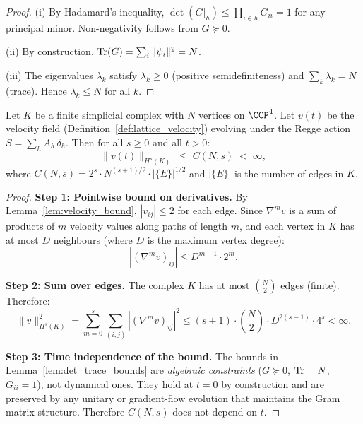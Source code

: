 \begin{proof}
(i) By Hadamard's inequality, $\det(G|_h) \leq \prod_{i \in h} G_{ii}
= 1$ for any principal minor.  Non-negativity follows from
$G \succeq 0$.

(ii) By construction, $\operatorname{Tr}(G) = \sum_i \|\psi_i\|^2 = N$.

(iii) The eigenvalues $\lambda_k$ satisfy $\lambda_k \geq 0$
(positive semidefiniteness) and $\sum_k \lambda_k = N$ (trace).
Hence $\lambda_k \leq N$ for all $k$.
\end{proof}

\begin{theorem}
\label{thm:lattice_regularity}
Let $K$ be a finite simplicial complex with $N$ vertices on $\CCP^4$.
Let $v(t)$ be the velocity field (Definition~\ref{def:lattice_velocity})
evolving under the Regge action $S = \sum_h A_h\,\delta_h$.
Then for all $s \geq 0$ and all $t > 0$:
\begin{equation}
\boxed{\|v(t)\|_{H^s(K)} \;\leq\; C(N, s) \;<\; \infty,}
\end{equation}
where $C(N,s) = 2^s \cdot N^{(s+1)/2} \cdot |\{E\}|^{1/2}$ and
$|\{E\}|$ is the number of edges in $K$.
\end{theorem}

\begin{proof}
\textbf{Step 1: Pointwise bound on derivatives.}
By Lemma~\ref{lem:velocity_bound}, $|v_{ij}| \leq 2$ for each edge.
Since $\nabla^m v$ is a sum of products of $m$ velocity values along
paths of length $m$, and each vertex in $K$ has at most $D$ neighbours
(where $D$ is the maximum vertex degree):
\begin{equation}
|(\nabla^m v)_{ij}| \leq D^{m-1} \cdot 2^m.
\end{equation}

\textbf{Step 2: Sum over edges.}
The complex $K$ has at most $\binom{N}{2}$ edges (finite).  Therefore:
\begin{equation}
\|v\|_{H^s(K)}^2 = \sum_{m=0}^{s} \sum_{(i,j)} |(\nabla^m v)_{ij}|^2
\leq (s+1) \cdot \binom{N}{2} \cdot D^{2(s-1)} \cdot 4^s < \infty.
\end{equation}

\textbf{Step 3: Time independence of the bound.}
The bounds in Lemma~\ref{lem:det_trace_bounds} are
\emph{algebraic constraints} ($G \succeq 0$, $\operatorname{Tr} = N$, $G_{ii} = 1$),
not dynamical ones.  They hold at $t = 0$ by construction and are
preserved by any unitary or gradient-flow evolution that maintains the
Gram matrix structure.  Therefore $C(N,s)$ does not depend on $t$.
\end{proof}

